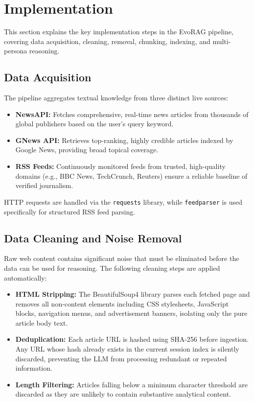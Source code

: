 \section{Implementation}

This section explains the key implementation steps in the EvoRAG pipeline, covering data acquisition, cleaning, removal, chunking, indexing, and multi-persona reasoning.

\subsection{Data Acquisition}

The pipeline aggregates textual knowledge from three distinct live sources:

\begin{itemize}
    \item \textbf{NewsAPI:} Fetches comprehensive, real-time news articles from thousands of global publishers based on the user’s query keyword.
    \item \textbf{GNews API:} Retrieves top-ranking, highly credible articles indexed by Google News, providing broad topical coverage.
    \item \textbf{RSS Feeds:} Continuously monitored feeds from trusted, high-quality domains (e.g., BBC News, TechCrunch, Reuters) ensure a reliable baseline of verified journalism.
\end{itemize}

HTTP requests are handled via the \texttt{requests} library, while \texttt{feedparser} is used specifically for structured RSS feed parsing.

\subsection{Data Cleaning and Noise Removal}

Raw web content contains significant noise that must be eliminated before the data can be used for reasoning. The following cleaning steps are applied automatically:

\begin{itemize}
    \item \textbf{HTML Stripping:} The BeautifulSoup4 library parses each fetched page and removes all non-content elements including CSS stylesheets, JavaScript blocks, navigation menus, and advertisement banners, isolating only the pure article body text.
    \item \textbf{Deduplication:} Each article URL is hashed using SHA-256 before ingestion. Any URL whose hash already exists in the current session index is silently discarded, preventing the LLM from processing redundant or repeated information.
    \item \textbf{Length Filtering:} Articles falling below a minimum character threshold are discarded as they are unlikely to contain substantive analytical content.
\end{itemize}

